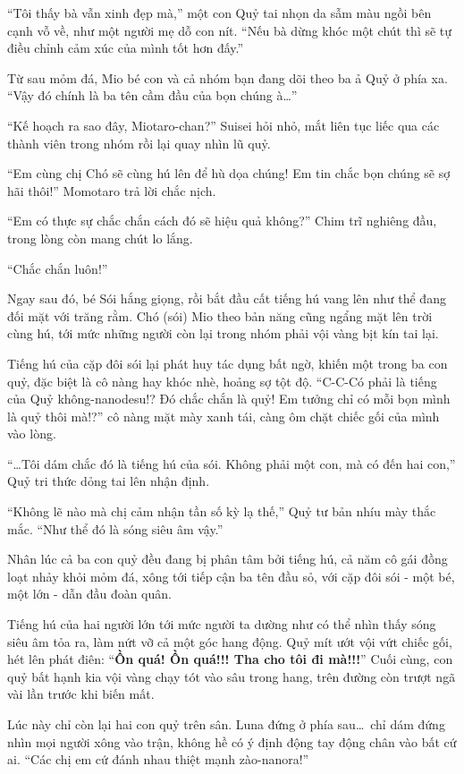 \documentclass[../main.tex]{subfiles}
\begin{document}
``Tôi thấy bà vẫn xinh đẹp mà,'' một con Quỷ tai nhọn da sẫm màu ngồi bên cạnh vỗ về, như một người mẹ dỗ con nít. ``Nếu bà dừng khóc một chút thì sẽ tự điều chỉnh cảm xúc của mình tốt hơn đấy.''

Từ sau mỏm đá, Mio bé con và cả nhóm bạn đang dõi theo ba ả Quỷ ở phía xa. ``Vậy đó chính là ba tên cầm đầu của bọn chúng à\dots''

``Kế hoạch ra sao đây, Miotaro-chan?'' Suisei hỏi nhỏ, mắt liên tục liếc qua các thành viên trong nhóm rồi lại quay nhìn lũ quỷ.

``Em cùng chị Chó sẽ cùng hú lên để hù dọa chúng! Em tin chắc bọn chúng sẽ sợ hãi thôi!'' Momotaro trả lời chắc nịch.

``Em có thực sự chắc chắn cách đó sẽ hiệu quả không?'' Chim trĩ nghiêng đầu, trong lòng còn mang chút lo lắng.

``Chắc chắn luôn!''

Ngay sau đó, bé Sói hắng giọng, rồi bắt đầu cất tiếng hú vang lên như thể đang đối mặt với trăng rằm. Chó (sói) Mio theo bản năng cũng ngẩng mặt lên trời cùng hú, tới mức những người còn lại trong nhóm phải vội vàng bịt kín tai lại.

Tiếng hú của cặp đôi sói lại phát huy tác dụng bất ngờ, khiến một trong ba con quỷ, đặc biệt là cô nàng hay khóc nhè, hoảng sợ tột độ. ``C-C-Có phải là tiếng của Quỷ không-nanodesu!? Đó chắc chắn là quỷ! Em tưởng chỉ có mỗi bọn mình là quỷ thôi mà!?'' cô nàng mặt mày xanh tái, càng ôm chặt chiếc gối của mình vào lòng.

``\dots Tôi dám chắc đó là tiếng hú của sói. Không phải một con, mà có đến hai con,'' Quỷ tri thức dỏng tai lên nhận định.

``Không lẽ nào mà chị cảm nhận tần số kỳ lạ thế,'' Quỷ tư bản nhíu mày thắc mắc. ``Như thể đó là sóng siêu âm vậy.''

Nhân lúc cả ba con quỷ đều đang bị phân tâm bởi tiếng hú, cả năm cô gái đồng loạt nhảy khỏi mỏm đá, xông tới tiếp cận ba tên đầu sỏ, với cặp đôi sói - một bé, một lớn - dẫn đầu đoàn quân.

Tiếng hú của hai người lớn tới mức người ta dường như có thể nhìn thấy sóng siêu âm tỏa ra, làm nứt vỡ cả một góc hang động. Quỷ mít ướt vội vứt chiếc gối, hét lên phát điên: ``\textbf{Ồn quá! Ồn quá!!! Tha cho tôi đi mà!!!}'' Cuối cùng, con quỷ bất hạnh kia vội vàng chạy tót vào sâu trong hang, trên đường còn trượt ngã vài lần trước khi biến mất.

Lúc này chỉ còn lại hai con quỷ trên sân. Luna đứng ở phía sau\dots\ chỉ dám đứng nhìn mọi người xông vào trận, không hề có ý định động tay động chân vào bất cứ ai. ``Các chị em cứ đánh nhau thiệt mạnh zào-nanora!''
\end{document}
